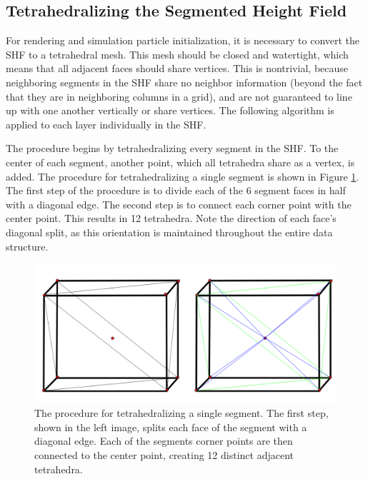 \subsection{Tetrahedralizing the Segmented Height Field}

For rendering and simulation particle initialization, it is necessary to convert the SHF to a tetrahedral mesh. This mesh should be closed and watertight, which means that all adjacent faces should share vertices. This is nontrivial, because neighboring segments in the SHF share no neighbor information (beyond the fact that they are in neighboring columns in a grid), and are not guaranteed to line up with one another vertically or share vertices. The following algorithm is applied to each layer individually in the SHF.

The procedure begins by tetrahedralizing every segment in the SHF. To the center of each segment, another point, which all tetrahedra share as a vertex, is added. The procedure for tetrahedralizing a single segment is shown in Figure \ref{figure:TetrahedralizeASegment}. The first step of the procedure is to divide each of the 6 segment faces in half with a diagonal edge. The second step is to connect each corner point with the center point. This results in 12 tetrahedra. Note the direction of each face's diagonal split, as this orientation is maintained throughout the entire data structure.

\begin{figure}[t]
\centering
\begin{minipage}[b]{0.9\linewidth}
\begin{center}
\includegraphics[width=\textwidth]{images/DividingASegment.png}
\end{center}
\end{minipage}
\caption[Tetrahedralizing a segment]
{\label{figure:TetrahedralizeASegment} The procedure for tetrahedralizing a single segment. The first step, shown in the left image, splits each face of the segment with a diagonal edge. Each of the segments corner points are then connected to the center point, creating 12 distinct adjacent tetrahedra. }
\end{figure}

